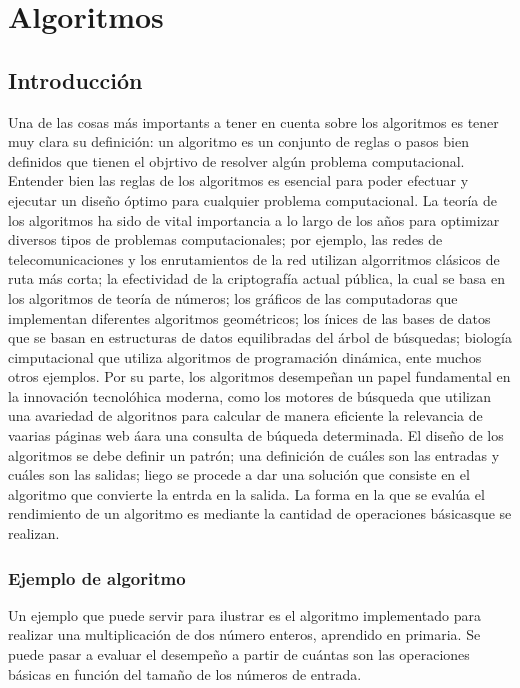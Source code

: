 \chapter{Algoritmos}

    \section{Introducción}

        Una de las cosas más importants a tener en cuenta sobre los algoritmos es tener muy clara su definición: un algoritmo es un conjunto de reglas o pasos bien definidos que tienen el objrtivo de resolver algún problema computacional. Entender bien las reglas de los algoritmos es esencial para poder efectuar y ejecutar un diseño óptimo para cualquier problema computacional. La teoría de los algoritmos ha sido de vital importancia a lo largo de los años para optimizar diversos tipos de problemas computacionales; por ejemplo, las redes de telecomunicaciones y los enrutamientos de la red utilizan algorritmos clásicos de ruta más corta; la efectividad de la criptografía actual pública, la cual se basa en los algoritmos de teoría de números; los gráficos de las computadoras que implementan diferentes algoritmos geométricos; los ínices de las bases de datos que se basan en estructuras de datos equilibradas del árbol de búsquedas; biología cimputacional que utiliza algoritmos de programación dinámica, ente muchos otros ejemplos. Por su parte, los algoritmos desempeñan un papel fundamental en la innovación tecnolóhica moderna, como los motores de búsqueda que utilizan una avariedad de algoritnos para calcular de manera eficiente la relevancia de vaarias páginas web áara una consulta de búqueda determinada. El diseño de los algoritmos se debe definir un patrón; una definición de cuáles son las entradas y cuáles son las salidas; liego se procede a dar una solución que consiste en el algoritmo que convierte la entrda en la salida. La forma en la que se evalúa el rendimiento de un algoritmo es mediante la cantidad de operaciones básicasque se realizan.

        \subsection{Ejemplo de algoritmo}

            Un ejemplo que puede servir para ilustrar es el algoritmo implementado para realizar una multiplicación de dos número enteros, aprendido en primaria. Se puede pasar a evaluar el desempeño a partir de cuántas son las operaciones básicas en función del tamaño de los números de entrada.

